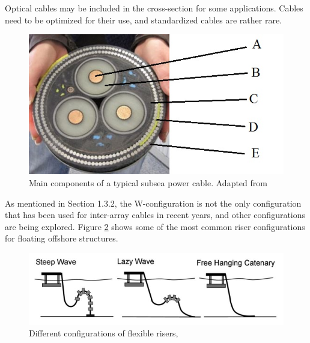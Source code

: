 \noindent Optical cables may be included in the cross-section for some applications. Cables need to be optimized for their use, and standardized cables are rather rare. 


\begin{figure}[H]
\centering
\includegraphics[scale=0.8]{figures/pcable}
\caption[$\; \:$Main components of a typical subsea power cable]{Main components of a typical subsea power cable. Adapted from \cite{Boltinha2016} }
 \label{fig:pcable}
\end{figure}

\noindent As mentioned in Section 1.3.2, the W-configuration is not the only configuration that has been used for inter-array cables in recent years, and other configurations are being explored. Figure \ref{fig:config} shows some of the most common riser configurations for floating offshore structures. 

\begin{figure}[H]
\centering
\includegraphics[scale=0.8]{figures/config}
\caption[$\; \:$Different configurations of flexible risers]{Different configurations of flexible risers, \cite{Thies2012}}
 \label{fig:config}
\end{figure}

